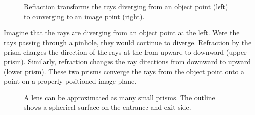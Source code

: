 \documentclass[
  letterpaper,
]{book}
\begin{document}
\begin{figure}


\caption{\label{fig-thinlens-prism}Refraction transforms the rays
diverging from an object point (left) to converging to an image point
(right).}

\end{figure}%

Imagine that the rays are diverging from an object point at the left.
Were the rays passing through a pinhole, they would continue to diverge.
Refraction by the prism changes the direction of the rays at the from
upward to downward (upper prism). Similarly, refraction changes the ray
directions from downward to upward (lower prism). These two prisms
converge the rays from the object point onto a point on a properly
positioned image plane.

\begin{figure}


\caption{\label{fig-thinlens-prism}A lens can be approximated as many
small prisms. The outline shows a spherical surface on the entrance and
exit side.}

\end{figure}%
\end{document}
